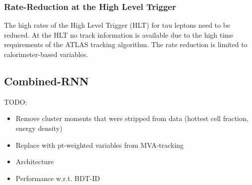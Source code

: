 \subsubsection{Rate-Reduction at the High Level Trigger}
\label{sec:hlt_rate_reduction}

The high rates of the High Level Trigger (HLT) for tau leptons need to be
reduced. At the HLT no track information is available due to the high time
requirements of the ATLAS tracking algorithm. The rate reduction is limited to
calorimeter-based variables.

\subsection{Combined-RNN}
\label{sec:rnn_combined}

TODO:
\begin{itemize}
\item Remove cluster moments that were stripped from data (hottest cell
  fraction, energy density)
\item Replace with pt-weighted variables from MVA-tracking
\end{itemize}

\begin{itemize}
\item Architecture
\item Performance w.r.t. BDT-ID
\end{itemize}


